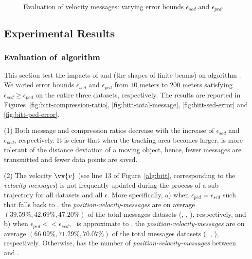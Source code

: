{{\begin{figure}[tb!]
	\vspace{-2ex}
	\caption{\small Evaluation of velocity messages: varying error bounds $\epsilon_{sed}$ and $\epsilon_{ped}$.}
	\label{fig:speed-message}
	\vspace{-1ex}
\end{figure}
}%



\subsection{Experimental Results}

\subsubsection{Evaluation of~algorithm \bitt}
This section test the impacts of \ped and \sed (\ie the shapes of finite beams) on algorithm \bitt. We varied error bounds $\epsilon_{sed}$ and $\epsilon_{ped}$ from $10$ meters to $200$ meters satisfying $\epsilon_{sed} \ge \epsilon_{ped}$ on the entire three datasets, respectively. The results are reported in Figures~\ref{fig:bitt-compression-ratio}, \ref{fig:bitt-total-message}, \ref{fig:bitt-sed-error} and \ref{fig:bitt-ped-error}.



\ni (1) Both message and compression ratios decrease with the increase of $\epsilon_{sed}$ and $\epsilon_{ped}$, respectively. It is clear that when the tracking area becomes larger, \bitt is more tolerant of the distance deviation of a moving object, hence, fewer messages are transmitted and fewer data points are saved.

\ni (2) The velocity  $\vv{v}$ (see line 13 of Figure~\ref{alg:bitt}, corresponding to the \emph{velocity-messages}) is not frequently updated during the process of a sub-trajectory for all datasets and all $\epsilon$. More specifically, 
a) when $\epsilon_{ped}=\epsilon_{sed}$ such that \bitt falls back to \citt, the \emph{position-velocity-messages} are on average $(39.59\%, 42.69\%, 47.20\%)$ of the total messages \wrt datasets (\mopsi, \sercar, \geolife), respectively, and 
b) when $\epsilon_{ped} << \epsilon_{sed}$, \ie~\bitt is approximate to \sitt, the \emph{position-velocity-messages} are on average $(66.09\%, 71.29\%, 70.07\%)$ of the total messages \wrt datasets (\mopsi, \sercar, \geolife), respectively. 
Otherwise, \bitt has the number of \emph{position-velocity-messages} between \citt and \sitt.

}
